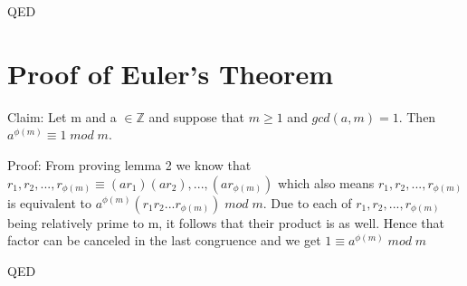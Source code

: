 \documentclass{article}
\begin{document}
QED

\pagebreak
\section{Proof of Euler's Theorem}
Claim: Let m and a $\in \mathbb{Z}$ and suppose that $m \geq 1$ and $gcd(a,m) = 1$. Then $a^{\phi(m)} \equiv 1 \; mod\;  m$.

Proof: From proving lemma 2 we know that $r_1, r_2, ..., r_{\phi(m)} \equiv (ar_1)(ar_2),...,(ar_{\phi(m)})$ which also means $r_1, r_2, ..., r_{\phi(m)}$ is equivalent to $a^{\phi(m)} (r_1 r_2... r_{\phi(m)}) \; mod \; m$. Due to each of $r_1, r_2, ..., r_{\phi(m)}$ being relatively prime to m, it follows that their product is as well. Hence that factor can be canceled in the last congruence and we get $1 \equiv a^{\phi(m)} \; mod \; m$

QED\newline\newline
\end{document}

